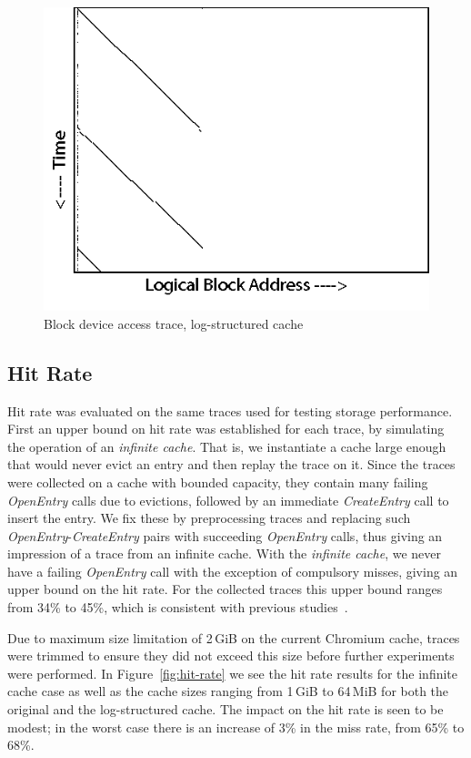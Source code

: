 \documentclass[letterpaper,twocolumn,10pt]{article}
\begin{document}
\begin{figure}
\centering
\includegraphics[width=0.717\columnwidth]{graphs/flash.png}
\caption{Block device access trace, log-structured cache}
\label{fig:blktrace:flash}
\end{figure}

\subsection{Hit Rate}

Hit rate was evaluated on the same traces used for testing storage
performance. First an upper bound on hit rate was established for each trace, by
simulating the operation of an \emph{infinite cache}.  That is, we instantiate a
cache large enough that would never evict an entry and then replay the trace on
it.  Since the traces were collected on a cache with bounded capacity, they
contain many failing \emph{OpenEntry} calls due to evictions, followed by an
immediate \emph{CreateEntry} call to insert the entry.  We fix these by
preprocessing traces and replacing such \emph{OpenEntry}-\emph{CreateEntry}
pairs with succeeding \emph{OpenEntry} calls, thus giving an impression of a
trace from an infinite cache.  With the \emph{infinite cache}, we never have a
failing \emph{OpenEntry} call with the exception of compulsory misses, giving an
upper bound on the hit rate.  For the collected traces this upper bound ranges
from 34\% to 45\%, which is consistent with previous studies~\cite{souders12}.

Due to maximum size limitation of 2\,GiB on the current Chromium cache, traces
were trimmed to ensure they did not exceed this size before further experiments
were performed.  In Figure~\ref{fig:hit-rate} we see the hit rate results for
the infinite cache case as well as the cache sizes ranging from 1\,GiB to
64\,MiB for both the original and the log-structured cache.
The impact on the hit rate is seen to be modest; in the worst case there is an
increase of 3\% in the miss rate, from 65\% to 68\%.
\end{document}

